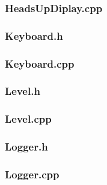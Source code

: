 \documentclass{article}
\begin{document}
\subsubsection{HeadsUpDiplay.cpp}
	 		
	 				
\subsubsection{Keyboard.h}
	 
	 				
\subsubsection{Keyboard.cpp}
	 
	 				
\subsubsection{Level.h}
	 
	 				
\subsubsection{Level.cpp}
	 
	 				
\subsubsection{Logger.h}
	 
	 				
\subsubsection{Logger.cpp}
	
	 				
\end{document}
